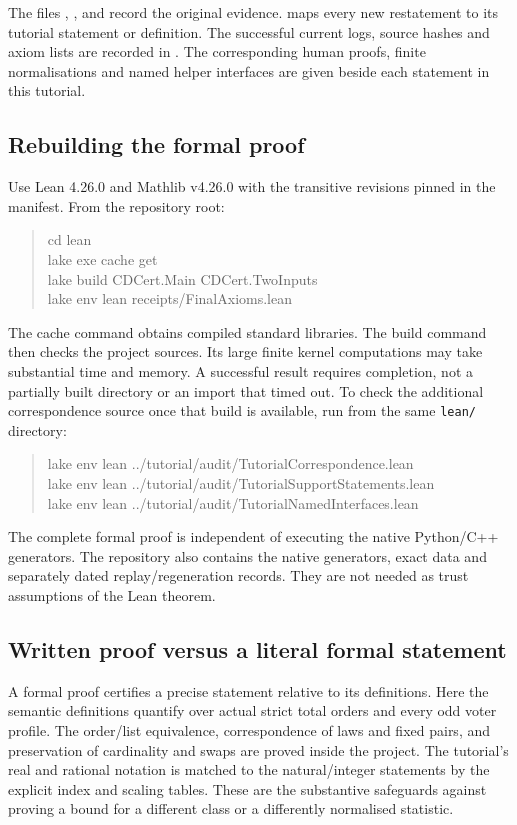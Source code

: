 The files ,
,
 and
record the original evidence.
 maps every new restatement
to its tutorial statement or definition. The successful current logs,
source hashes and axiom lists are recorded in
.
The corresponding human proofs, finite
normalisations and named helper interfaces are given beside each
statement in this tutorial.

\subsection{Rebuilding the formal proof}
Use Lean 4.26.0 and Mathlib v4.26.0 with the transitive revisions pinned
in the manifest. From the repository root:
\begin{quote}\small\ttfamily
cd lean\\
lake exe cache get\\
lake build CDCert.Main CDCert.TwoInputs\\
lake env lean receipts/FinalAxioms.lean
\end{quote}
The cache command obtains compiled standard libraries. The build
command then checks the project sources. Its large finite
kernel computations may take substantial time and memory. A successful
result requires completion, not a partially built directory or an
import that timed out. To check the additional correspondence source
once that build is available, run from the same \texttt{lean/} directory:
\begin{quote}\small\ttfamily
lake env lean ../tutorial/audit/TutorialCorrespondence.lean\\
lake env lean ../tutorial/audit/TutorialSupportStatements.lean\\
lake env lean ../tutorial/audit/TutorialNamedInterfaces.lean
\end{quote}
The complete formal proof is independent of executing the native
Python/C++ generators. The repository also contains the native generators, exact data and
separately dated replay/regeneration records.
They are not needed as trust assumptions of the Lean theorem.

\subsection{Written proof versus a literal formal statement}
A formal proof certifies a precise statement relative to its definitions.
Here the semantic definitions quantify over actual strict total orders
and every odd voter profile. The order/list equivalence, correspondence
of laws and fixed pairs, and preservation of cardinality and swaps are
proved inside the project. The tutorial's real and rational notation is
matched to the natural/integer statements by the explicit index and
scaling tables. These are the substantive safeguards against proving a
bound for a different class or a differently normalised statistic.

